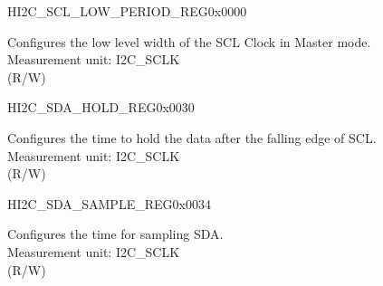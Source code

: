 \begin{register}{H}{I2C\_SCL\_LOW\_PERIOD\_REG}{0x0000}\label{regdesc:I2CSCLLOWPERIODREG}
%
%
\regnewline%
\begin{regdesc}\begin{reglist}
\label{fielddesc:I2CSCLLOWPERIOD}\item [I2C\_SCL\_LOW\_PERIOD] Configures the low level width of the SCL Clock in Master mode. \\
Measurement unit: I2C\_SCLK \\ (R/W)
\end{reglist}\end{regdesc}
\end{register}


\begin{register}{H}{I2C\_SDA\_HOLD\_REG}{0x0030}\label{regdesc:I2CSDAHOLDREG}
%
%
\regnewline%
\begin{regdesc}\begin{reglist}
\label{fielddesc:I2CSDAHOLDTIME}\item [I2C\_SDA\_HOLD\_TIME] Configures the time to hold the data after the falling edge of SCL.\\
Measurement unit: I2C\_SCLK \\ (R/W)
\end{reglist}\end{regdesc}
\end{register}


\begin{register}{H}{I2C\_SDA\_SAMPLE\_REG}{0x0034}\label{regdesc:I2CSDASAMPLEREG}
%
%
\regnewline%
\begin{regdesc}\begin{reglist}
\label{fielddesc:I2CSDASAMPLETIME}\item [I2C\_SDA\_SAMPLE\_TIME] Configures the time for sampling SDA.\\
Measurement unit: I2C\_SCLK \\ (R/W)
\end{reglist}\end{regdesc}
\end{register}


